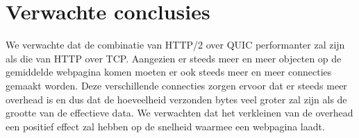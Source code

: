 \documentclass[fleqn,10pt]{voorstel}
\begin{document}
\section{Verwachte conclusies}
\label{sec:verwachte_conclusies}
We verwachte dat de combinatie van HTTP/2 over QUIC performanter zal zijn als die van HTTP over TCP. Aangezien er steeds meer en meer objecten op de gemiddelde webpagina komen moeten er ook steeds meer en meer connecties gemaakt worden. Deze verschillende connecties zorgen ervoor dat er steeds meer overhead is en dus dat de hoeveelheid verzonden bytes veel groter zal zijn als de grootte van de effectieve data. We verwachten dat het verkleinen van de overhead een positief effect zal hebben op de snelheid waarmee een webpagina laadt. 

\printbibliography[heading=bibintoc]
\end{document}
